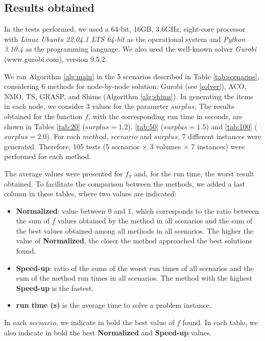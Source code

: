 \documentclass[preprint]{elsarticle}
\begin{document}
\subsection{Results obtained}

In the tests performed, we used a 64-bit, 16GB, 3.6GHz, eight-core processor with {\it Linux Ubuntu 22.04.1 LTS 64-bit} as the operational system and {\it Python 3.10.4}\/ as the programming language. We also used the well-known solver {\it Gurobi}\/ (www.gurobi.com), version 9.5.2.

We ran Algorithm \ref{alg:main} in the 5 scenarios described in Table \ref{tab:scenarios}, considering 6 methods for node-by-node solution: Gurobi (see \ref{solver}), ACO, NMO, TS, GRASP, and Shims (Algorithm \ref{alg:shims}). In generating the items in each node, we consider 3 values for the parameter $surplus$. The results obtained for the function $f$, with the corresponding run time in seconds, are shown in Tables \ref{tab:20} ($surplus = 1.2$), \ref{tab:50} ($surplus = 1.5$) and \ref{tab:100} ($surplus = 2.0$). For each $method$, $scenario$\/ and $surplus$, 7 different instances were generated. Therefore, 105 tests (5 scenarios $\times$\/ 3 volumes $\times$\/ 7 instances) were performed for each method. 

The average values were presented for $f_{\pi}$\/ and, for the run time, the worst result obtained. To facilitate the comparison between the methods, we added a last column in these tables, where two values are indicated:
\begin{itemize}
	\item {\bf Normalized}: value between 0 and 1, which corresponds to the ratio between the sum of $f$\/ values obtained by the method in all scenarios and the sum of the best values obtained among all methods in all scenarios. The higher the value of {\bf Normalized}, the closer the method approached the best solutions found.
	\item {\bf Speed-up}: ratio of the sums of the worst run times of all scenarios and the sum of the method run times in all scenarios. The method with the highest {\bf Speed-up}\/ is the fastest.
	
	\item {\bf run time (s)} is the average time to solve a problem instance.
\end{itemize}

In each $scenario$\/, we indicate in bold the best value of $f$\/ found. In each table, we also indicate in bold the best {\bf Normalized}\/ and {\bf Speed-up}\/ values.
\end{document}
